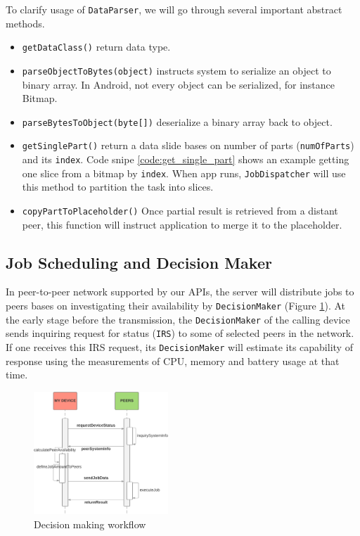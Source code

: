 \documentclass[conference]{IEEEtran}
\begin{document}
To clarify usage of \texttt{DataParser}, we will go through several important abstract methods.

\begin{itemize}
	\item \texttt{getDataClass()} return data type.
	\item \texttt{parseObjectToBytes(object)} instructs system to serialize an object to binary array. In Android, not every object can be serialized, for instance Bitmap.  
	\item \texttt{parseBytesToObject(byte[])} deserialize a binary array back to object.
	\item \texttt{getSinglePart()} return a data slide bases on number of parts (\texttt{numOfParts}) and its \texttt{index}. Code snipe \ref{code:get_single_part} shows an example getting one slice from a bitmap by \texttt{index}. When app runs, \texttt{JobDispatcher} will use this method to partition the task into slices.
	\item \texttt{copyPartToPlaceholder()} Once partial result is retrieved from a distant peer, this function will instruct application to merge it to the placeholder.
\end{itemize}


\subsection{Job Scheduling and Decision Maker} \label{scheduling}

In peer-to-peer network supported by our APIs, the server will distribute jobs to peers bases on investigating their availability by \texttt{DecisionMaker} (Figure \ref{fig:checkStatus}). At the early stage before the transmission, the \texttt{DecisionMaker} of the calling device sends inquiring request for status (\texttt{IRS}) to some of selected peers in the network. If one receives this IRS request, its \texttt{DecisionMaker} will estimate its capability of response using the measurements of CPU, memory and battery usage at that time. 

\begin{figure}[H]
\centerline {
\includegraphics[width=0.45\textwidth, natwidth=915, natheight=837]{data/checkStatusFlow}
}
\caption{Decision making workflow}
\label{fig:checkStatus}
\end{figure}
\end{document}
